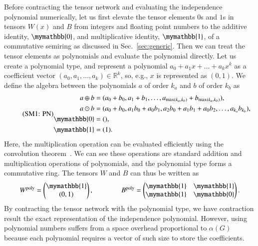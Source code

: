 \documentclass[onefignum, onetabnum]{siamart190516}
\newcommand{\eqname}[1]{\stepcounter{equation}\tag{\theequation : #1}}
\newcommand{\<}{\langle}
\renewcommand{\>}{\rangle}
\begin{document}
Before contracting the tensor network and evaluating the independence polynomial numerically, let us first elevate the tensor elements $0$s and $1$s in tensors $W(x)$ and $B$ from integers and floating point numbers to the additive identity,
$\mymathbb{0}$, and multiplicative identity, $\mymathbb{1}$, of a commutative semiring as discussed in Sec.~\ref{sec:generic}.
Then we can treat the tensor elements as polynomials and evaluate the polynomial directly.
Let us create a polynomial type, and represent a polynomial $a_0 + a_1 x + \ldots + a_k x^k$ as a coefficient vector $(a_0, a_1, \ldots, a_k) \in \mathbb{R}^k$, so, e.g., $x$ is represented as $(0, 1)$.
We define the algebra between the polynomials $a$ of order $k_a$ and $b$ of order $k_b$ as
\begin{equation}
    \eqname{PN}
    \begin{split}
    a \oplus b &= (a_0 + b_0, a_1 + b_1, \ldots, a_{\max(k_a, k_b)} + b_{\max(k_a, k_b)}),\\
    a \odot b &= (a_0 + b_0, a_1b_0 + a_0b_1, a_{2}b_{0} + a_{1}b_{1} + a_{0}b_{2},  \ldots, a_{k_a} b_{k_b}),\\
    \mymathbb{0} &= (),  \\
    \mymathbb{1} &= (1).\label{eq:polynomial}
    \end{split}
\end{equation}
Here, the multiplication operation can be evaluated efficiently using the convolution theorem~\cite{Schonhage1971}.
We can see these operations are standard addition and multiplication operations of polynomials, and the polynomial type forms a commutative ring. The tensors $W$ and $B$ can thus be written as 
\begin{equation}
    W^{\rm poly} = \left(\begin{matrix}
        \mymathbb{1} \\
        (0,1)
    \end{matrix}\right),   
    \qquad \qquad
        B^{\rm poly} = \left(\begin{matrix}
        \mymathbb{1}  & \mymathbb{1} \\
        \mymathbb{1} & \mymathbb{0}
    \end{matrix}\right).
\end{equation}
By contracting the tensor network with the polynomial type, we have contraction result the exact representation of the independence polynomial.
However, using polynomial numbers suffers from a space overhead proportional to $\alpha(G)$ because each polynomial requires a vector of such size to store the coefficients. 
\end{document}
